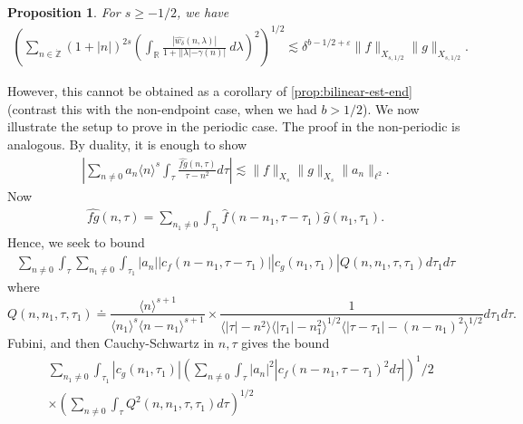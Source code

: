 \documentclass[12pt,reqno]{amsart}
\numberwithin{equation}{section}  %
\renewcommand{\cref}{\Cref}
\newcommand{\rr}{\mathbb{R}}
\newcommand{\zz}{\mathbb{Z}}
\newcommand{\zzdot}{\dot{\zz}}
\newcommand{\wh}{\widehat}
\newcommand{\ee}{\varepsilon}
\newtheorem{proposition}[theorem]{Proposition}
\begin{document}
\begin{proposition}
For $s \ge -1/2$, we have
\begin{gather*}
\left( \sum_{n \in \zzdot} \left (1 + |n| \right )^{2s}  \left ( \int_\rr
    \frac{|\wh{w_{\delta}}(n, \lambda)|}{1 + | |\lambda| - \gamma(n)|}
    \ d\lambda \right )^2 \right)^{1/2} \lesssim \delta^{b-1/2 + \ee} \| f \|_{X_{s, 1/2}} \| g \|_{X_{s,1/2}}.
\end{gather*}
\label{prop:bilin-endpoint-d}
\end{proposition}
%
However, this cannot be obtained as a corollary of \eqref{prop:bilinear-est-end} (contrast this with the non-endpoint case, when we had $b > 1/2$). We now illustrate the setup to prove \cref{prop:bilin-endpoint-d} in the periodic case. The proof in the non-periodic is analogous. By duality, it is enough to show
%
%
\begin{equation*}
\begin{split}
| \sum_{n \neq 0} a_{n} \langle n \rangle ^{s} \int_{\tau} \frac{\wh{fg}(n, \tau)}{\tau - n^{2}} d \tau | \lesssim \| f \|_{X_{s}} \| g \|_{X_{s}} \| a_{n} \|_{\ell^{2}}.
\end{split}
\end{equation*}
%
%
Now
%
%
\begin{equation*}
\begin{split}
\wh{fg}(n, \tau) = \sum_{n_{1} \neq 0} \int_{\tau_{1}} \wh{f}(n - n_{1}, \tau - \tau_{1}) \wh{g}(n_{1}, \tau_{1}).
\end{split}
\end{equation*}
%
%
Hence, we seek to bound
%
%
\begin{equation*}
\begin{split}
\sum_{n \neq 0} \int_{\tau} \sum_{n_{1} \neq 0} \int_{\tau_{1}} | a_{n} | | c_{f}(n - n_{1}, \tau - \tau_{1}) | | c_{g}(n_{1}, \tau_{1}) | Q(n, n_{1}, \tau, \tau_{1}) d \tau_{1} d \tau
\end{split}
\end{equation*}
%
%
where
\begin{equation*}
Q(n, n_{1}, \tau, \tau_{1}) \doteq \frac{\langle n \rangle ^{s+1}}{\langle n_{1} \rangle ^{s} \langle
    n-n_{1} \rangle ^{s+1}} 
    \times \frac{1}{\langle | \tau | - n^{2} \rangle \langle |\tau_{1}|-n_{1}^{2} \rangle^{1/2}\langle | \tau -
    \tau_{1}|-(n - n_{1})^{2}
    \rangle^{1/2}} d \tau_1 d \tau.
\end{equation*}
%
%
Fubini, and then Cauchy-Schwartz in $n, \tau$ gives the bound
%
%
\begin{equation*}
\begin{split}
& \sum_{n_{1} \neq 0} \int_{\tau_{1}} | c_{g}(n_{1}, \tau_{1}) | 
\left( \sum_{n \neq 0} \int_{\tau} | a_{n} |^{2} | c_{f}(n - n_{1}, \tau - \tau_{1})^{2} d\tau | \right)^	1/2
\\
& \times\left( \sum_{n \neq 0} \int_{\tau} Q^{2}(n, n_{1}, \tau, \tau_{1}) d \tau \right)^{1/2}
\end{split}
\end{equation*}
\end{document}
